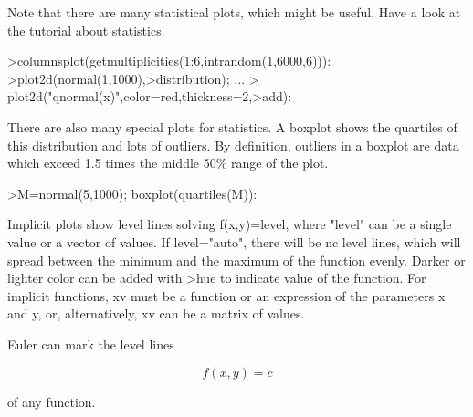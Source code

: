 \documentclass{article}
\begin{document}
\begin{eulernotebook}
\begin{eulercomment}
\begin{eulercomment}
\begin{eulercomment}
\begin{eulercomment}
\begin{eulercomment}
\begin{eulercomment}
\begin{eulercomment}
Note that there are many statistical plots, which might be useful. Have a look at the
tutorial about statistics.
\end{eulercomment}
\begin{eulerprompt}
>columnsplot(getmultiplicities(1:6,intrandom(1,6000,6))):
>plot2d(normal(1,1000),>distribution); ...
>  plot2d("qnormal(x)",color=red,thickness=2,>add):
\end{eulerprompt}
\begin{eulercomment}
There are also many special plots for statistics. A boxplot shows the quartiles of
this distribution and lots of outliers. By definition, outliers in a boxplot are data
which exceed 1.5 times the middle 50\% range of the plot.
\end{eulercomment}
\begin{eulerprompt}
>M=normal(5,1000); boxplot(quartiles(M)):
\end{eulerprompt}
\begin{eulercomment}
Implicit plots show level lines solving f(x,y)=level, where "level" can be a single
value or a vector of values. If level="auto", there will be nc level lines, which will
spread between the minimum and the maximum of the function evenly. Darker or lighter
color can be added with \textgreater{}hue to indicate value of the function. For implicit
functions, xv must be a function or an expression of the parameters x and y, or,
alternatively, xv can be a matrix of values.

Euler can mark the level lines

\end{eulercomment}
\begin{eulerformula}
\[
f(x,y) = c
\]
\end{eulerformula}
\begin{eulercomment}
of any function.


\end{eulercomment}
\end{eulercomment}
\end{eulercomment}
\end{eulercomment}
\end{eulercomment}
\end{eulercomment}
\end{eulercomment}
\end{eulernotebook}
\end{document}
